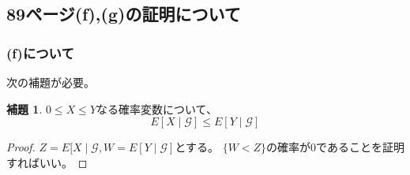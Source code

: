 \documentclass[11pt, a4paper]{jsarticle}
\theoremstyle{definition}
\newtheorem{lem}[thm]{補題}
\begin{document}
    \subsection{89ページ(f),(g)の証明について}
      \subsubsection{(f)について}
      次の補題が必要。
      \begin{lem}\label{lem1}
        $0 \leq X \leq Y$なる確率変数について、
        \[
          E[X \mid \mathcal{G}] \leq E[Y \mid \mathcal{G}]
        \]
      \end{lem}

      \begin{proof}
        $Z = E[X \mid \mathcal{G}, W = E[Y \mid \mathcal{G}]$とする。
        $\{W < Z\}$の確率が$0$であることを証明すればいい。
      \end{proof}
\end{document}
